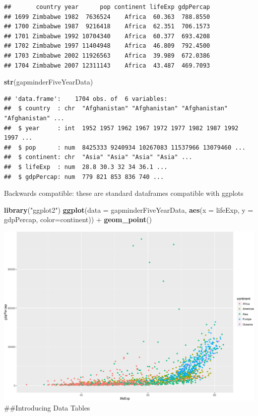 \documentclass[]{article}
\newenvironment{Shaded}{\begin{snugshade}}{\end{snugshade}}
\newcommand{\KeywordTok}[1]{\textcolor[rgb]{0.13,0.29,0.53}{\textbf{{#1}}}}
\newcommand{\DataTypeTok}[1]{\textcolor[rgb]{0.13,0.29,0.53}{{#1}}}
\newcommand{\StringTok}[1]{\textcolor[rgb]{0.31,0.60,0.02}{{#1}}}
\newcommand{\NormalTok}[1]{{#1}}
\begin{document}
\begin{verbatim}
##       country year      pop continent lifeExp gdpPercap
## 1699 Zimbabwe 1982  7636524    Africa  60.363  788.8550
## 1700 Zimbabwe 1987  9216418    Africa  62.351  706.1573
## 1701 Zimbabwe 1992 10704340    Africa  60.377  693.4208
## 1702 Zimbabwe 1997 11404948    Africa  46.809  792.4500
## 1703 Zimbabwe 2002 11926563    Africa  39.989  672.0386
## 1704 Zimbabwe 2007 12311143    Africa  43.487  469.7093
\end{verbatim}

\begin{Shaded}
\begin{Highlighting}[]
\KeywordTok{str}\NormalTok{(gapminderFiveYearData)}
\end{Highlighting}
\end{Shaded}

\begin{verbatim}
## 'data.frame':    1704 obs. of  6 variables:
##  $ country  : chr  "Afghanistan" "Afghanistan" "Afghanistan" "Afghanistan" ...
##  $ year     : int  1952 1957 1962 1967 1972 1977 1982 1987 1992 1997 ...
##  $ pop      : num  8425333 9240934 10267083 11537966 13079460 ...
##  $ continent: chr  "Asia" "Asia" "Asia" "Asia" ...
##  $ lifeExp  : num  28.8 30.3 32 34 36.1 ...
##  $ gdpPercap: num  779 821 853 836 740 ...
\end{verbatim}

Backwards compatible: these are standard dataframes compatible with
ggplots

\begin{Shaded}
\begin{Highlighting}[]
\KeywordTok{library}\NormalTok{(}\StringTok{"ggplot2"}\NormalTok{)}
\KeywordTok{ggplot}\NormalTok{(}\DataTypeTok{data =} \NormalTok{gapminderFiveYearData, }\KeywordTok{aes}\NormalTok{(}\DataTypeTok{x =} \NormalTok{lifeExp, }\DataTypeTok{y =} \NormalTok{gdpPercap, }\DataTypeTok{color=}\NormalTok{continent)) +}
\StringTok{  }\KeywordTok{geom_point}\NormalTok{()}
\end{Highlighting}
\end{Shaded}

\includegraphics{Figs/unnamed-chunk-4-1.pdf}\\
 \#\#Introducing Data Tables
\end{document}
